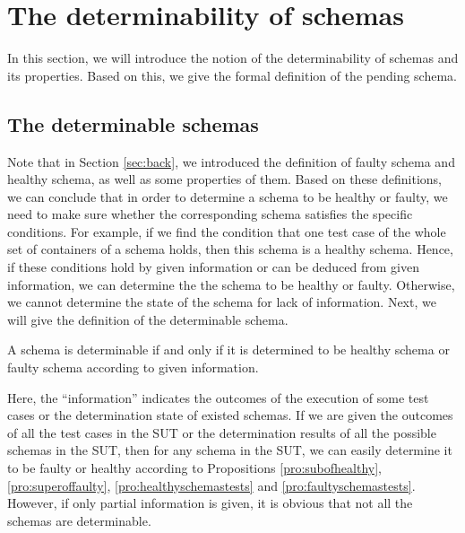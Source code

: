 \section{The determinability of schemas}\label{sec:pending}
In this section, we will introduce the notion of the determinability of schemas and its properties. Based on this, we give the formal definition of the pending schema.


\subsection{The determinable schemas}\label{sec:pending:determinable}
Note that in Section \ref{sec:back}, we introduced the definition of faulty schema and healthy schema, as well as some properties of them. Based on these definitions, we can conclude that in order to determine a schema to be healthy or faulty, we need to make sure whether the corresponding schema satisfies the specific conditions. For example, if we find the condition that one test case of the whole set of containers of a schema holds, then this schema is a healthy schema. Hence, if these conditions hold by given information or can be deduced from given information, we can determine the the schema to be healthy or faulty. Otherwise, we cannot determine the state of the schema for lack of information. Next, we will give the definition of the determinable schema.


\begin{definition}\label{de:deteminable}
A schema is determinable if and only if it is determined to be healthy schema or faulty schema according to given information.
\end{definition}

Here, the ``information'' indicates the outcomes of the execution of some test cases or the determination state of existed schemas. If we are given the outcomes of all the test cases in the SUT or the determination results of all the possible schemas in the SUT, then for any schema in the SUT, we can easily determine it to be faulty or healthy according to Propositions \ref{pro:subofhealthy}, \ref{pro:superoffaulty}, \ref{pro:healthyschemastests} and \ref{pro:faultyschemastests}. However, if only partial information is given, it is obvious that not all the schemas are determinable.

